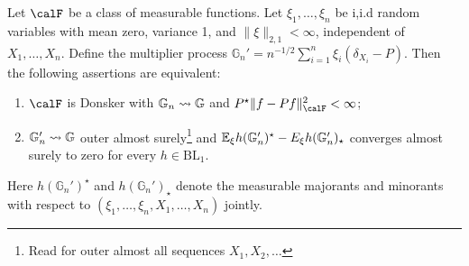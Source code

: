 \begin{theorem}
	\label{thm:conditional-multiplier-clt}
	Let \(\calF\) be a class of measurable functions. Let \(\xi_1,\dots,\xi_n\) be i,i.d random variables with mean zero, variance 1, and \(\|\xi\|_{2,1}<\infty\), independent of \(X_1,\dots,X_n\). Define the multiplier process \(\mathbb{G}_n'=n^{-1/2}\sum_{i=1}^n \xi_i(\delta_{X_i}-P)\). Then the following assertions are equivalent:
	\begin{enumerate}
		\item \(\calF\) is Donsker with \(\mathbb{G}_n\rightsquigarrow\mathbb{G}\) and \(P^\star\|f-Pf\|_\calF^2<\infty\);
		\item \(\mathbb{G}_n'\rightsquigarrow\mathbb{G}\) outer almost surely\footnote{Read for outer almost all sequences \(X_1,X_2,\dots\)} and \(\mathbb{E}_\xi h(\mathbb{G}_n')^\star-E_\xi h(\mathbb{G}_n')_\star\) converges almost surely to zero for every \(h\in \text{BL}_1\).
	\end{enumerate}
	Here \(h(\mathbb{G}_n')^\star\) and \(h(\mathbb{G}_n')_\star\) denote the measurable majorants and minorants with respect to \(\left(\xi_1,\dots,\xi_n,X_1,\dots,X_n\right)\) jointly.
\end{theorem}


